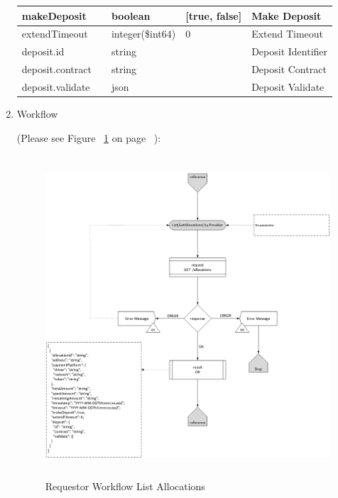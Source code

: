 \begin{enumerate}
\begin{table}[H]
\begin{center}
\begin{tabular}{|p{3cm}|l|p{3cm}|p{3cm}|p{4cm}|}
makeDeposit					& 	& 	boolean				&	[true, false]				&	Make Deposit \\ 
\hline

extendTimeout				& 	& 	integer(\$int64)	&	0							&	Extend Timeout \\ 
\hline

deposit.id					&   & 	string				&								&	Deposit Identifier \\
\hline

deposit.contract			&   &	string				&								&	Deposit Contract \\
\hline

deposit.validate			&   &	json				&								&	Deposit Validate \\
\hline

\end{tabular}
\end{center}
\end{table}

\item Workflow

(Please see Figure ~\ref{fig:RLA} on page ~\pageref{fig:RLA}):

\begin{figure}[htbp]
    \centering
    \includegraphics[width=12cm,height=12cm,angle=0]{./diag/Workflow/Payment/List(GetAllocations)-R-Workflow.png}
    \caption{Requestor Workflow List Allocations }
	\label{fig:RLA}
\end{figure}


\end{enumerate}

